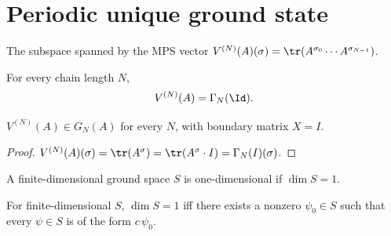 \section{Periodic unique ground state}\label{sec:periodic_unique_ground_state}

\begin{definition}\label{def:mpv_submodule}
    \leanok
    The subspace spanned by the MPS vector
    $V^{(N)}(A)(\sigma) = \tr(A^{\sigma_0}\cdots A^{\sigma_{N-1}})$.
\end{definition}

\begin{lemma}
    \label{lem:mpv_eq_ground_space_map_one}
    \leanok
    For every chain length $N$,
    \[
        V^{(N)}(A) = \Gamma_{N}(\Id).
    \]
\end{lemma}

\begin{lemma}\label{lem:mpv_mem_ground_space}
    \leanok
    $V^{(N)}(A) \in G_N(A)$ for every $N$, with boundary matrix $X = I$.
\end{lemma}

\begin{proof}
    \leanok
    $V^{(N)}(A)(\sigma) = \tr(A^\sigma) = \tr(A^\sigma \cdot I) = \Gamma_N(I)(\sigma)$.
\end{proof}

\begin{definition}\label{def:has_unique_ground_state}
    \leanok
    A finite-dimensional ground space $S$ is one-dimensional if $\dim S = 1$.
\end{definition}

\begin{theorem}\label{thm:has_unique_ground_state_iff_proportional}
    \leanok
    For finite-dimensional $S$, $\dim S = 1$ iff there exists a nonzero
    $\psi_0 \in S$ such that every $\psi \in S$ is of the form $c\,\psi_0$.
\end{theorem}

